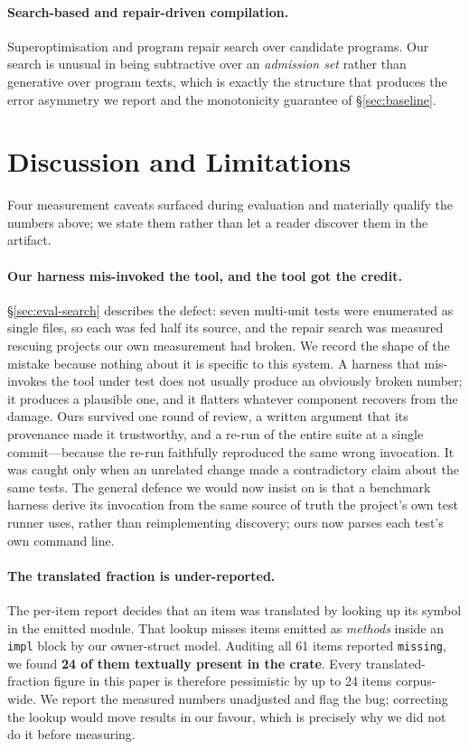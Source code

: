 \documentclass[10pt,twocolumn]{article}
\begin{document}
\paragraph{Search-based and repair-driven compilation.} Superoptimisation and
program repair search over candidate programs. Our search is unusual in being
subtractive over an \emph{admission set} rather than generative over program
texts, which is exactly the structure that produces the error asymmetry we
report and the monotonicity guarantee of \S\ref{sec:baseline}.

\section{Discussion and Limitations}
\label{sec:discussion}

Four measurement caveats surfaced during evaluation and materially qualify
the numbers above; we state them rather than let a reader discover them in the
artifact.

\paragraph{Our harness mis-invoked the tool, and the tool got the credit.}
\S\ref{sec:eval-search} describes the defect: seven multi-unit tests were
enumerated as single files, so each was fed half its source, and the repair
search was measured rescuing projects our own measurement had broken. We
record the shape of the mistake because nothing about it is specific to this
system. A harness that mis-invokes the tool under test does not usually
produce an obviously broken number; it produces a plausible one, and it
flatters whatever component recovers from the damage. Ours survived one round
of review, a written argument that its provenance made it trustworthy, and a
re-run of the entire suite at a single commit---because the re-run faithfully
reproduced the same wrong invocation. It was caught only when an unrelated
change made a contradictory claim about the same tests. The general defence we
would now insist on is that a benchmark harness derive its invocation from the
same source of truth the project's own test runner uses, rather than
reimplementing discovery; ours now parses each test's own command line.

\paragraph{The translated fraction is under-reported.} The per-item report
decides that an item was translated by looking up its symbol in the emitted
module. That lookup misses items emitted as \emph{methods} inside an
\texttt{impl} block by our owner-struct model. Auditing all 61 items reported
\texttt{missing}, we found \textbf{24 of them textually present in the crate}.
Every translated-fraction figure in this paper is therefore pessimistic by up
to 24 items corpus-wide. We report the measured numbers unadjusted and flag
the bug; correcting the lookup would move results in our favour, which is
precisely why we did not do it before measuring.
\end{document}
